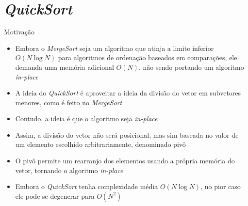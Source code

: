 \section{\it QuickSort}

\begin{frame}[fragile]{Motivação}

    \begin{itemize}
        \item Embora o \textit{MergeSort} seja um algoritmo que atinja a limite
            inferior $O(N\log N)$ para algoritmos de ordenação baseados em
            comparações, ele demanda uma memória adicional $O(N)$, não sendo portando
            um algoritmo \textit{in-place}

        \item A ideia do \textit{QuickSort} é aproveitar a ideia da divisão do vetor em
            subvetores menores, como é feito no \textit{MergeSort}

        \item Contudo, a ideia é que o algoritmo seja \textit{in-place}

        \item Assim, a divisão do vetor não será posicional, mas sim baseada no valor de um
            elemento escolhido arbitrariamente, denominado pivô

        \item O pivô permite um rearranjo dos elementos usando a própria memória do vetor,
            tornando o algoritmo \textit{in-place}

        \item Embora o \textit{QuickSort} tenha complexidade média $O(N\log N)$, no pior caso
            ele pode se degenerar para $O(N^2)$
    \end{itemize}

\end{frame}

